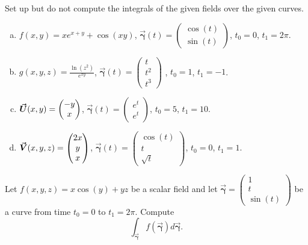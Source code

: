 \documentclass[12pt]{article} %
\newcommand{\curvegamma}{\boldsymbol{\vec{\gamma}}}
\begin{document}
\begin{problem}
    Set up but do not compute the integrals of the given fields over the given curves.
    \begin{enumerate}[(a)]
        \item $f(x,y) = xe^{x+y}+\cos(xy)$, $\curvegamma(t) = \begin{pmatrix} \cos(t) \\ \sin(t) \end{pmatrix}$, $t_0 = 0$, $t_1=2\pi$.
        \item $g(x,y,z) = \frac{\ln(z^2)}{e^{xy}}$, $\curvegamma(t) = \begin{pmatrix} t \\ t^2 \\ t^3 \end{pmatrix}$ , $t_0 = 1$, $t_1=-1$.
        \item $\boldsymbol{\vec{U}}(x,y) = \begin{pmatrix} -y \\ x \end{pmatrix}$, $\curvegamma(t) = \begin{pmatrix} e^t \\ e^t \end{pmatrix}$, $t_0 = 5$, $t_1=10$.
        \item $\boldsymbol{\vec{V}}(x,y,z) = \begin{pmatrix} 2x \\ y \\ x \end{pmatrix}$, $\curvegamma(t) = \begin{pmatrix} \cos(t) \\ t \\ \sqrt{t} \end{pmatrix}$, $t_0 = 0$, $t_1=1$.
    \end{enumerate}
\end{problem}

\begin{problem}
Let $f(x,y,z)=x \cos(y) + yz$ be a scalar field and let $\curvegamma = \begin{pmatrix} 1 \\ t \\ \sin(t) \end{pmatrix}$ be a curve from time $t_0 = 0$ to $t_1 = 2 \pi$. Compute
\[
    \int_{\curvegamma} f(\curvegamma)d\curvegamma.
\]
\end{problem}
\end{document}
